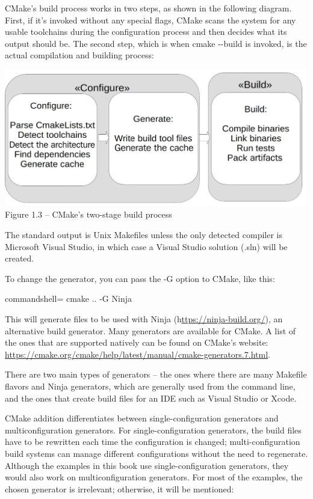 
CMake's build process works in two steps, as shown in the following diagram. First, if it's invoked without any special flags, CMake scans the system for any usable toolchains during the configuration process and then decides what its output should be. The second step, which is when cmake -{}-build is invoked, is the actual compilation and building process:

\begin{center}
\includegraphics[width=1.\textwidth]{content/1/chapter1/images/3.jpg}\\
Figure 1.3 – CMake's two-stage build process
\end{center}

The standard output is Unix Makefiles unless the only detected compiler is Microsoft Visual Studio, in which case a Visual Studio solution (.sln) will be created. 

To change the generator, you can pass the -G option to CMake, like this:

\begin{tcblisting}{commandshell={}}
cmake .. -G Ninja
\end{tcblisting}

This will generate files to be used with Ninja (h\url{ttps://ninja-build.org/}), an alternative build generator. Many generators are available for CMake. A list of the ones that are supported natively can be found on CMake's website: \url{https://cmake.org/cmake/help/latest/manual/cmake-generators.7.html}.

There are two main types of generators – the ones where there are many Makefile flavors and Ninja generators, which are generally used from the command line, and the ones that create build files for an IDE such as Visual Studio or Xcode.

CMake addition differentiates between single-configuration generators and multiconfiguration generators. For single-configuration generators, the build files have to be rewritten each time the configuration is changed; multi-configuration build systems can manage different configurations without the need to regenerate. Although the examples in this book use single-configuration generators, they would also work on multiconfiguration generators. For most of the examples, the chosen generator is irrelevant; otherwise, it will be mentioned:

